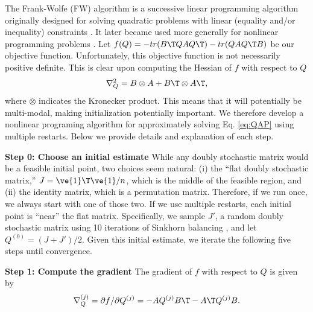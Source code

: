 \documentclass[10pt,journal,cspaper,compsoc]{IEEEtran}
\begin{document}
The Frank-Wolfe (FW) algorithm 
is a successive linear programming algorithm 
 originally designed for solving quadratic problems with linear (equality and/or inequality) constraints \cite{Frank1956}. It later became used more generally 
for nonlinear programming problems \cite{Bradley1977}.  
Let $f(Q)=- tr(B\T QAQ\T) - tr(QAQ\T B)$ be our objective function. Unfortunately, this objective function is not necessarily positive definite.  This is clear upon computing the Hessian of $f$  with respect to $Q$
\begin{align}
	\nabla_Q^2  =  B \otimes A + B\T \otimes A\T,
\end{align}
where $\otimes$ indicates the Kronecker product. This means that it will potentially be multi-modal, making initialization potentially important.  We therefore develop a nonlinear programing algorithm for approximately solving Eq. \eqref{eq:QAP} using multiple restarts.  Below we provide details and explanation of each step.

\textbf{Step 0: Choose an initial estimate} While any doubly stochastic matrix would be a feasible initial point, two choices seem natural: (i) the ``flat doubly  stochastic matrix,'' $J=\ve{1}\T \ve{1}/n$, which is the middle of the feasible region, and (ii) the identity matrix, which is a permutation matrix.  Therefore, if we run \qap  once, we always start with one of those two.  If we use multiple restarts, each initial point is ``near'' the flat matrix.  Specifically, we sample $J'$, a random doubly stochastic matrix using 10 iterations of Sinkhorn balancing \cite{Sinkhorn1964}, and let $Q^{(0)}=(J+J')/2$. Given this initial estimate, we iterate the following five steps until convergence.

\textbf{Step 1: Compute the gradient} The gradient of $f$ with respect to $Q$ is given by
\begin{align} \label{eq:grad}
	\nabla_Q^{(j)} = \partial f / \partial Q^{(j)} =  - A Q^{(j)} B\T - A\T Q^{(j)} B.
\end{align}

\end{document}
